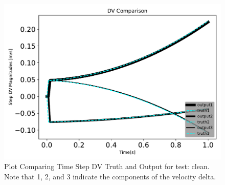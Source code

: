 \begin{figure}[htbp]\centerline{\includegraphics[height=0.7\textwidth, keepaspectratio]{AutoTeX/cleanDVcomparison}}\caption{Plot Comparing Time Step DV Truth and Output for test: clean. Note that 1, 2, and 3 indicate the components of the velocity delta.}\label{fig:cleanDVcomparison}\end{figure}